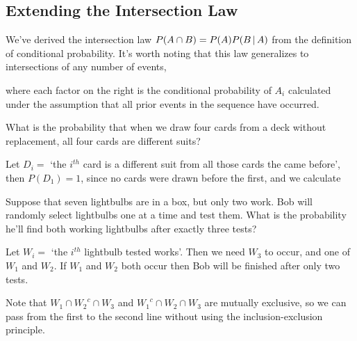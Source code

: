\subsection*{Extending the Intersection Law}

We've derived the intersection law $P(A \cap B) = P(A) P(B \,|\, A)$ from the definition of conditional probability. It's worth noting that this law generalizes to intersections of any number of events,
\par
\noindent where each factor on the right is the conditional probability of $A_i$ calculated under the assumption that all prior events in the sequence have occurred.
\begin{examp}
What is the probability that when we draw four cards from a deck without replacement, all four cards are different suits?
\par
\noindent Let $D_i =$ `the $i^{th}$ card is a different suit from all those cards the came before', then $P(D_1) = 1$, since no cards were drawn before the first, and we calculate
\end{examp}
\begin{examp}
Suppose that seven lightbulbs are in a box, but only two work. Bob will randomly select lightbulbs one at a time and test them. What is the probability he'll find both working lightbulbs after exactly three tests?
\par
\noindent Let $W_i =$ `the $i^{th}$ lightbulb tested works'. Then we need $W_3$ to occur, and one of $W_1$ and $W_2$. If $W_1$ and $W_2$ both occur then Bob will be finished after only two tests.
\par
\noindent Note that $W_1 \cap {W_2}^c \cap W_3$ and ${W_1}^c \cap W_2 \cap W_3$ are mutually exclusive, so we can pass from the first to the second line without using the inclusion-exclusion principle.
\end{examp}

